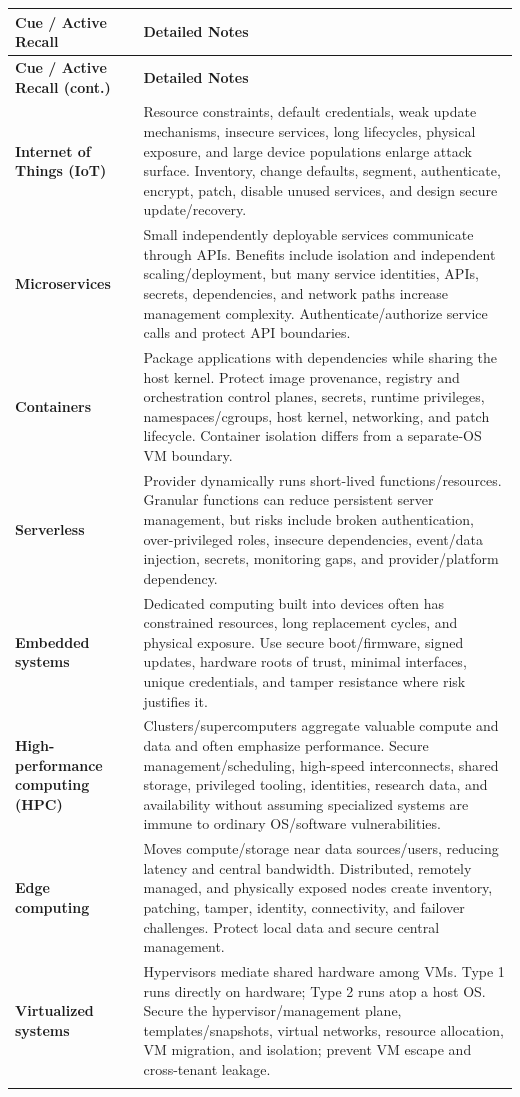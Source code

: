 \documentclass[10pt,letterpaper]{article}
\makeatletter
\newenvironment{cornell}{\rowcolors{2}{white}{notebg}\begin{longtable}{@{}>{\raggedright\arraybackslash\columncolor{cuebg}\color{navy}\bfseries}p{0.285\textwidth}>{\raggedright\arraybackslash}p{0.65\textwidth}@{}}
\rowcolor{navy}\color{white}\textbf{Cue / Active Recall} & \color{white}\textbf{Detailed Notes}\\ \hline\endfirsthead
\rowcolor{navy}\color{white}\textbf{Cue / Active Recall (cont.)} & \color{white}\textbf{Detailed Notes}\\ \hline\endhead}{\end{longtable}}
\newcommand{\noterow}[2]{#1 & #2\\\arrayrulecolor{line}\hline}
\makeatother
\begin{document}
\begin{cornell}
\noterow{Internet of Things (IoT)}{Resource constraints, default credentials, weak update mechanisms, insecure services, long lifecycles, physical exposure, and large device populations enlarge attack surface. Inventory, change defaults, segment, authenticate, encrypt, patch, disable unused services, and design secure update/recovery.}
\noterow{Microservices}{Small independently deployable services communicate through APIs. Benefits include isolation and independent scaling/deployment, but many service identities, APIs, secrets, dependencies, and network paths increase management complexity. Authenticate/authorize service calls and protect API boundaries.}
\noterow{Containers}{Package applications with dependencies while sharing the host kernel. Protect image provenance, registry and orchestration control planes, secrets, runtime privileges, namespaces/cgroups, host kernel, networking, and patch lifecycle. Container isolation differs from a separate-OS VM boundary.}
\noterow{Serverless}{Provider dynamically runs short-lived functions/resources. Granular functions can reduce persistent server management, but risks include broken authentication, over-privileged roles, insecure dependencies, event/data injection, secrets, monitoring gaps, and provider/platform dependency.}
\noterow{Embedded systems}{Dedicated computing built into devices often has constrained resources, long replacement cycles, and physical exposure. Use secure boot/firmware, signed updates, hardware roots of trust, minimal interfaces, unique credentials, and tamper resistance where risk justifies it.}
\noterow{High-performance computing (HPC)}{Clusters/supercomputers aggregate valuable compute and data and often emphasize performance. Secure management/scheduling, high-speed interconnects, shared storage, privileged tooling, identities, research data, and availability without assuming specialized systems are immune to ordinary OS/software vulnerabilities.}
\noterow{Edge computing}{Moves compute/storage near data sources/users, reducing latency and central bandwidth. Distributed, remotely managed, and physically exposed nodes create inventory, patching, tamper, identity, connectivity, and failover challenges. Protect local data and secure central management.}
\noterow{Virtualized systems}{Hypervisors mediate shared hardware among VMs. Type 1 runs directly on hardware; Type 2 runs atop a host OS. Secure the hypervisor/management plane, templates/snapshots, virtual networks, resource allocation, VM migration, and isolation; prevent VM escape and cross-tenant leakage.}
\end{cornell}
\end{document}
